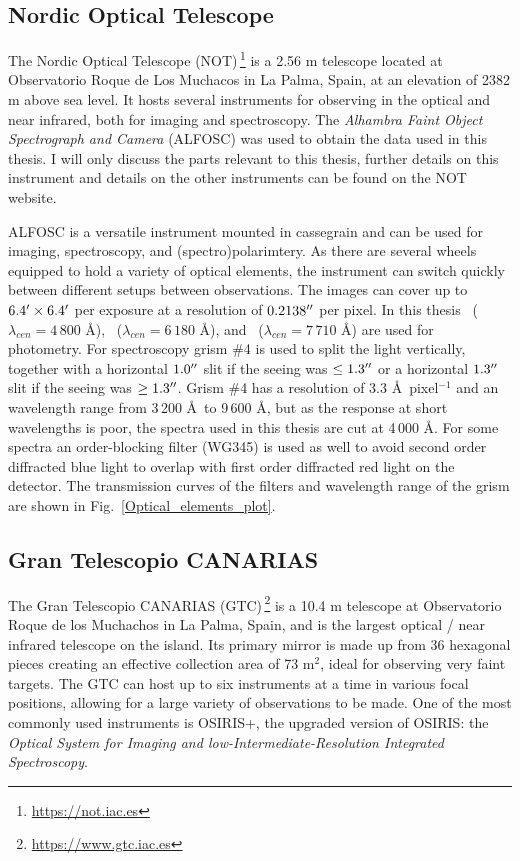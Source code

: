 \documentclass[a4paper,oneside,12pt, class=Latex/Classes/PhDthesisPSnPDF, crop=false]{standalone}
\begin{document}
\subsection{Nordic Optical Telescope}
\label{NOT}
The Nordic Optical Telescope (NOT)\,\footnote{\url{https://not.iac.es}} is a 2.56 m telescope located at Observatorio Roque de Los Muchacos in La Palma, Spain, at an elevation of 2382 m above sea level. It hosts several instruments for observing in the optical and near infrared, both for imaging and spectroscopy. The \textit{Alhambra Faint Object Spectrograph and Camera} (ALFOSC) was used to obtain the data used in this thesis. I will only discuss the parts relevant to this thesis, further details on this instrument and  details on the other instruments can be found on the NOT website.

ALFOSC is a versatile instrument mounted in cassegrain and can be used for imaging, spectroscopy, and (spectro)polarimtery. As there are several wheels equipped to hold a variety of optical elements, the instrument can switch quickly between different setups between observations. The images can cover up to $6.4^{\prime}\times6.4^{\prime}$ per exposure at a resolution of $0.2138^{\prime\prime}$ per pixel. In this thesis \ztfg~($\lambda_{cen} = 4\,800$ \AA), \ztfr~($\lambda_{cen} = 6\,180$ \AA), and \ztfi~($\lambda_{cen} = 7\,710$ \AA) are used for photometry. For spectroscopy grism \#4 is used to split the light vertically, together with a horizontal $1.0^{\prime\prime}$ slit if the seeing was $\leq1.3^{\prime\prime}$ or a horizontal $1.3^{\prime\prime}$ slit if the seeing was $\geq1.3^{\prime\prime}$. Grism \#4 has a resolution of 3.3 \AA~pixel$^{-1}$ and an wavelength range from 3\,200 \AA\ to 9\,600 \AA, but as the response at short wavelengths is poor, the spectra used in this thesis are cut at 4\,000 \AA. For some spectra an order-blocking filter (WG345) is used as well to avoid second order diffracted blue light to overlap with first order diffracted red light on the detector. The transmission curves of the filters and wavelength range of the grism are shown in Fig.~\ref{Optical_elements_plot}.


\subsection{Gran Telescopio CANARIAS}
\label{GTC}
The Gran Telescopio CANARIAS (GTC)\,\footnote{\url{https://www.gtc.iac.es}} is a 10.4 m telescope at Observatorio Roque de los Muchachos in La Palma, Spain, and is the largest optical / near infrared telescope on the island. Its primary mirror is made up from 36 hexagonal pieces creating an effective collection area of 73 m$^2$, ideal for observing very faint targets. The GTC can host up to six instruments at a time in various focal positions, allowing for a large variety of observations to be made. One of the most commonly used instruments is OSIRIS+, the upgraded version of OSIRIS: the \textit{Optical System for Imaging and low-Intermediate-Resolution Integrated Spectroscopy}.
\end{document}
